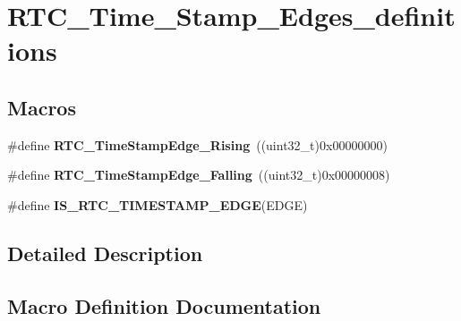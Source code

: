 \hypertarget{group___r_t_c___time___stamp___edges__definitions}{}\section{R\+T\+C\+\_\+\+Time\+\_\+\+Stamp\+\_\+\+Edges\+\_\+definitions}
\label{group___r_t_c___time___stamp___edges__definitions}
\subsection*{Macros}
\begin{DoxyCompactItemize}
\item 
\hypertarget{group___r_t_c___time___stamp___edges__definitions_gac3d8bb0310a1d86a4d1dc80ea6241218}{}\#define {\bfseries R\+T\+C\+\_\+\+Time\+Stamp\+Edge\+\_\+\+Rising}~((uint32\+\_\+t)0x00000000)\label{group___r_t_c___time___stamp___edges__definitions_gac3d8bb0310a1d86a4d1dc80ea6241218}

\item 
\hypertarget{group___r_t_c___time___stamp___edges__definitions_ga786fa99accdef27c983845f2de750357}{}\#define {\bfseries R\+T\+C\+\_\+\+Time\+Stamp\+Edge\+\_\+\+Falling}~((uint32\+\_\+t)0x00000008)\label{group___r_t_c___time___stamp___edges__definitions_ga786fa99accdef27c983845f2de750357}

\item 
\#define {\bfseries I\+S\+\_\+\+R\+T\+C\+\_\+\+T\+I\+M\+E\+S\+T\+A\+M\+P\+\_\+\+E\+D\+G\+E}(E\+D\+G\+E)
\end{DoxyCompactItemize}


\subsection{Detailed Description}


\subsection{Macro Definition Documentation}
\hypertarget{group___r_t_c___time___stamp___edges__definitions_ga3ea7a85adeb5ff0bdc926156e4a92c5e}{}
